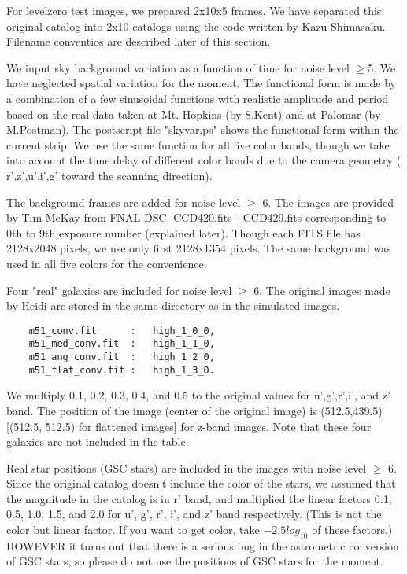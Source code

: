 For levelzero test images, we prepared 2x10x5 frames.
We have separated this original catalog
into 2x10 catalogs using the code written by Kazu Shimasaku.  
Filename conventios are described later of this section.

We input sky background variation as a function of time for noise level $\geq$5.
We have neglected spatial variation for the moment.
The functional form is made by a combination of a few sinusoidal
functions with realistic amplitude and period based on the
real data taken at Mt. Hopkins (by S.Kent) and at Palomar
(by M.Postman). The postscript file "skyvar.ps" shows
the functional form within the current strip.  We use the same function
for all five color bands, though we take into account the time delay of
different color bands due to the camera geometry
( r',z',u',i',g' toward the scanning direction).

The background frames are added for noise level $\geq$ 6.
The images are provided by Tim McKay from FNAL DSC.
CCD420.fits - CCD429.fits corresponding to 0th to 9th exposure number
(explained later).
Though each FITS file has 2128x2048 pixels, we use only first
2128x1354 pixels. The same background was used in all
five colors for the convenience.

Four "real" galaxies are included for noise level $\geq$ 6.
The original images made by Heidi are stored in the same directory
as in the simulated images.

\begin{verbatim}
    m51_conv.fit      :   high_1_0_0,
    m51_med_conv.fit  :   high_1_1_0,
    m51_ang_conv.fit  :   high_1_2_0,
    m51_flat_conv.fit :   high_1_3_0.
\end{verbatim}

We multiply 0.1, 0.2, 0.3, 0.4, and 0.5 to the original
values for u',g',r',i', and z' band.
The position of the image (center of the original image) is
(512.5,439.5) [(512.5, 512.5) for flattened images] for z-band
images. Note that these four galaxies are not included in the table.

Real star positions (GSC stars) are included in the images with
noise level $\geq$ 6. 
Since the original catalog doesn't include the color of the stars,
we assumed that the magnitude in the catalog is in r' band,
and multiplied the linear factors 0.1, 0.5, 1.0, 1.5, and 2.0
for u', g', r', i', and z' band respectively. (This is not the 
color but linear factor. If you want to get color, take $-2.5 log_{10}$
of these factors.) 
HOWEVER it turns out that there is a
serious bug in the astrometric conversion of GSC stars, so please do not
use the positions of GSC stars for the moment.

